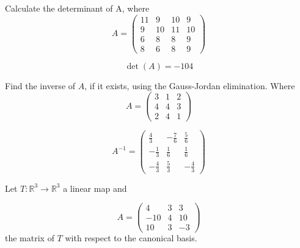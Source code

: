 \begin{questions}

\question Calculate the determinant of A, where
$$
A=\left(\begin{array}{rrrr}
11 & 9 & 10 & 9 \\
9 & 10 & 11 & 10 \\
6 & 8 & 8 & 9 \\
8 & 6 & 8 & 9
\end{array}\right)
$$

\begin{solution}
$$\det(A)=-104$$
\end{solution}

\question Find the inverse of $A$, if it exists, using the Gauss-Jordan elimination. Where
$$
A=\left(\begin{array}{rrr}
3 & 1 & 2 \\
4 & 4 & 3 \\
2 & 4 & 1
\end{array}\right)
$$

\begin{solution}
$$A^{-1}=\left(\begin{array}{rrr}
\frac{4}{3} & -\frac{7}{6} & \frac{5}{6} \\
-\frac{1}{3} & \frac{1}{6} & \frac{1}{6} \\
-\frac{4}{3} & \frac{5}{3} & -\frac{4}{3}
\end{array}\right)$$
\end{solution}

\question Let $T:\mathbb{R}^3\rightarrow\mathbb{R}^3$  a linear map and
 
$$
A=\left(\begin{array}{rrr}
4 & 3 & 3 \\
-10 & 4 & 10 \\
10 & 3 & -3
\end{array}\right)
$$
the matrix of $T$ with respect to the canonical basis.
\end{questions}
